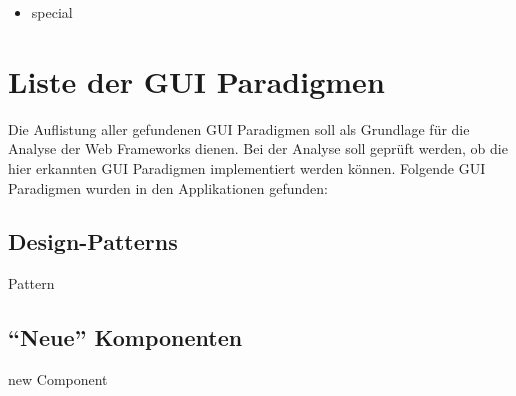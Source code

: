   \begin{itemize}
    \item special
  \end{itemize}
  
  \section{Liste der GUI Paradigmen}
  
  Die Auflistung aller gefundenen GUI Paradigmen soll als Grundlage für die
  Analyse der Web Frameworks dienen. Bei der Analyse soll geprüft werden, ob
  die hier erkannten GUI Paradigmen implementiert werden können. Folgende GUI
  Paradigmen wurden in den Applikationen gefunden:
      
  \subsection{Design-Patterns}
  
  \begin{description}
    \item[Pattern]
  \end{description}
  
  \subsection{``Neue'' Komponenten}
  
  \begin{description}
    \item[new Component]
  \end{description}
